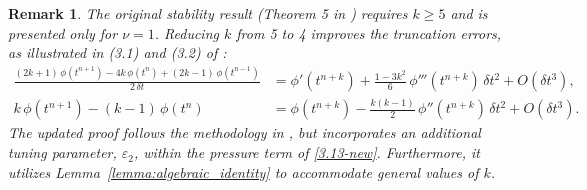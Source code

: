 \documentclass{article}
\newtheorem{remark}[theorem]{Remark}
\theoremstyle{definition}                   %
\begin{document}
\begin{remark}
\label{remark1}
The original stability result (Theorem 5 in \cite{HuangShen2023}) requires $k\ge 5$ and is presented only for $\nu=1$.
Reducing $k$ from 5 to 4 improves the truncation errors, as illustrated in (3.1) and (3.2) of \cite{HuangShen2023}: 
\begin{align}
\frac{(2k+1)\,\phi(t^{n+1}) - 4k\,\phi(t^{n}) + (2k-1)\,\phi(t^{n-1})}{2\,\delta t}
&= \phi'(t^{n+k})
+ \frac{1 - 3k^{2}}{6}\,\phi'''(t^{n+k})\,\delta t^{2}
+ O(\delta t^{3}),
\\
k\,\phi(t^{n+1}) - (k-1)\,\phi(t^n)
&= \phi(t^{n+k}) - \frac{k(k-1)}{2}\,\phi''(t^{n+k})\,\delta t^2 + O(\delta t^3).
\end{align}
The updated proof follows the methodology in \cite{HuangShen2023}, but incorporates an additional tuning parameter, $\varepsilon_2$, within the pressure term of \eqref{3.13-new}. Furthermore, it utilizes Lemma~\ref{lemma:algebraic_identity} to accommodate general values of $k$. 
\end{remark}
\end{document}
